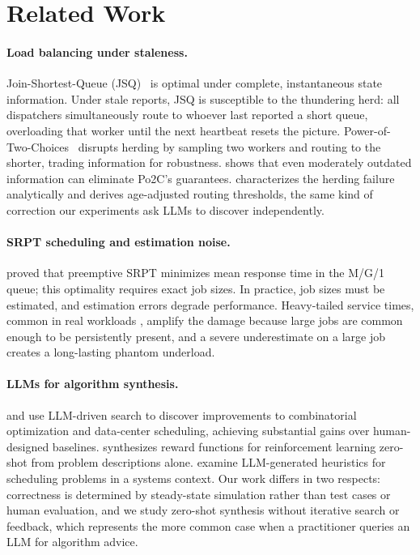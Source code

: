 \documentclass[11pt]{article}
\begin{document}
\section{Related Work}
\label{sec:related}

\paragraph{Load balancing under staleness.}
Join-Shortest-Queue (JSQ)~\citep{ahn1996jsq} is optimal under
complete, instantaneous state information.
Under stale reports, JSQ is susceptible to the thundering herd:
all dispatchers simultaneously route to whoever last reported a short
queue, overloading that worker until the next heartbeat resets the
picture.
Power-of-Two-Choices~\citep{mitzenmacher2001power} disrupts herding
by sampling two workers and routing to the shorter, trading
information for robustness.
\citet{mitzenmacher2000useful} shows that even moderately outdated
information can eliminate Po2C's guarantees.
\citet{dahlin2000stale} characterizes the herding failure analytically
and derives age-adjusted routing thresholds, the same kind of
correction our experiments ask LLMs to discover independently.

\paragraph{SRPT scheduling and estimation noise.}
\citet{schrage1968srpt} proved that preemptive SRPT minimizes mean
response time in the M/G/1 queue; this optimality requires exact
job sizes.
In practice, job sizes must be estimated, and estimation errors
degrade performance.
Heavy-tailed service times, common in real workloads
\citep{crovella1997selfsimilar}, amplify the damage because large
jobs are common enough to be persistently present, and a severe
underestimate on a large job creates a long-lasting phantom underload.

\paragraph{LLMs for algorithm synthesis.}
\citet{fawzi2024funsearch} and \citet{novikov2025alphaevolve} use
LLM-driven search to discover improvements to combinatorial
optimization and data-center scheduling, achieving substantial gains
over human-designed baselines.
\citet{ma2024eureka} synthesizes reward functions for reinforcement
learning zero-shot from problem descriptions alone.
\citet{cheng2025letbarbarians} examine LLM-generated heuristics for
scheduling problems in a systems context.
Our work differs in two respects: correctness is determined by
steady-state simulation rather than test cases or human evaluation,
and we study zero-shot synthesis without iterative search or feedback,
which represents the more common case when a practitioner queries
an LLM for algorithm advice.
\end{document}

